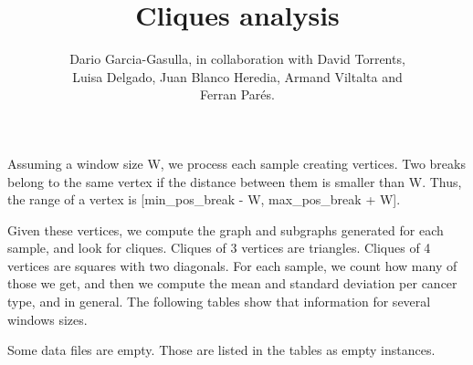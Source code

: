 \documentclass[a4paper,10pt]{article}
\title{Cliques analysis}
\author{Dario Garcia-Gasulla, in collaboration with David Torrents,\\ Luisa Delgado, Juan Blanco Heredia, Armand Viltalta and \\Ferran Par\'{e}s. }
\begin{document}
\maketitle


\section{}

Assuming a window size W, we process each sample creating vertices. Two breaks belong to the same vertex if the distance between them is smaller than W. Thus, the range of a vertex is [min\_pos\_break - W, max\_pos\_break + W].

Given these vertices, we compute the graph and subgraphs generated for each sample, and look for cliques. Cliques of 3 vertices are triangles. Cliques of 4 vertices are squares with two diagonals. For each sample, we count how many of those we get, and then we compute the mean and standard deviation per cancer type, and in general. The following tables show that information for several windows sizes.

Some data files are empty. Those are listed in the tables as empty instances.
\end{document}
